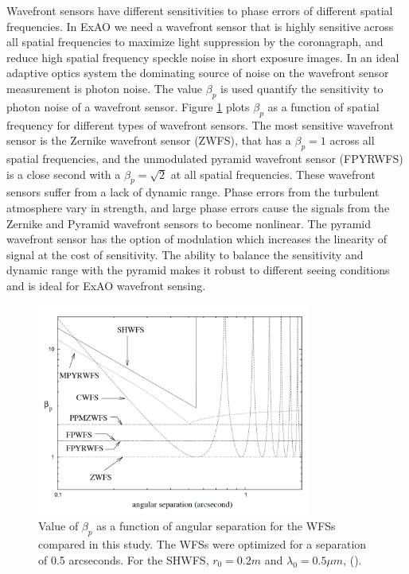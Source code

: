 Wavefront sensors have different sensitivities to phase errors of different spatial frequencies. In ExAO we need a wavefront sensor that is highly sensitive across all spatial frequencies to maximize light suppression by the coronagraph, and reduce high spatial frequency speckle noise in short exposure images. In an ideal adaptive optics system the dominating source of noise on the wavefront sensor measurement is photon noise. The value $\beta_p$ is used quantify the sensitivity to photon noise of a wavefront sensor. Figure \ref{fig:guyon2005} plots $\beta_p$ as a function of spatial frequency for different types of wavefront sensors. The most sensitive wavefront sensor is the Zernike wavefront sensor (ZWFS), that has a $\beta_p=1$ across all spatial frequencies, and the unmodulated pyramid wavefront sensor (FPYRWFS) is a close second with a $\beta_p=\sqrt{2}$ at all spatial frequencies. These wavefront sensors suffer from a lack of dynamic range. Phase errors from the turbulent atmosphere vary in strength, and large phase errors cause the signals from the Zernike and Pyramid wavefront sensors to become nonlinear. The pyramid wavefront sensor has the option of modulation which increases the linearity of signal at the cost of sensitivity. The ability to balance the sensitivity and dynamic range with the pyramid makes it robust to different seeing conditions and is ideal for ExAO wavefront sensing. 

\begin{figure}
    \centering
    \includegraphics[width=0.8\textwidth]{Chapter Materials/Chapter Two Materials/Guyon2005.png}
    \caption{Value of $\beta_p$ as a function of angular separation for the WFSs compared in this study. The WFSs were optimized for a separation of 0.5 arcseconds. For the SHWFS, $r_0 = 0.2m$ and $\lambda_0 = 0.5\mu m$, (\cite{guyon2005}).}
    \label{fig:guyon2005}
\end{figure}



